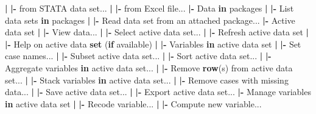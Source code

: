 \documentclass[12pt,]{krantz}
\newenvironment{Shaded}{\begin{snugshade}}{\end{snugshade}}
\newcommand{\ControlFlowTok}[1]{\textcolor[rgb]{0.13,0.29,0.53}{\textbf{#1}}}
\newcommand{\ErrorTok}[1]{\textcolor[rgb]{0.64,0.00,0.00}{\textbf{#1}}}
\newcommand{\KeywordTok}[1]{\textcolor[rgb]{0.13,0.29,0.53}{\textbf{#1}}}
\newcommand{\NormalTok}[1]{#1}
\newcommand{\OperatorTok}[1]{\textcolor[rgb]{0.81,0.36,0.00}{\textbf{#1}}}
\newcommand{\StringTok}[1]{\textcolor[rgb]{0.31,0.60,0.02}{#1}}
\begin{document}
\begin{Shaded}
\begin{Highlighting}[]
  \OperatorTok{|}\StringTok{ }\ErrorTok{|}\OperatorTok{-}\StringTok{ }\NormalTok{from STATA data set...}
  \OperatorTok{|}\StringTok{ }\ErrorTok{|}\OperatorTok{-}\StringTok{ }\NormalTok{from Excel file...}
  \OperatorTok{|-}\StringTok{ }\NormalTok{Data }\ControlFlowTok{in}\NormalTok{ packages}
  \OperatorTok{|}\StringTok{ }\ErrorTok{|}\OperatorTok{-}\StringTok{ }\NormalTok{List data sets }\ControlFlowTok{in}\NormalTok{ packages}
  \OperatorTok{|}\StringTok{ }\ErrorTok{|}\OperatorTok{-}\StringTok{ }\NormalTok{Read data set from an attached package...}
  \OperatorTok{|-}\StringTok{ }\NormalTok{Active data set}
  \OperatorTok{|}\StringTok{ }\ErrorTok{|}\OperatorTok{-}\StringTok{ }\NormalTok{View data...}
  \OperatorTok{|}\StringTok{ }\ErrorTok{|}\OperatorTok{-}\StringTok{ }\NormalTok{Select active data set...}
  \OperatorTok{|}\StringTok{ }\ErrorTok{|}\OperatorTok{-}\StringTok{ }\NormalTok{Refresh active data set}
  \OperatorTok{|}\StringTok{ }\ErrorTok{|}\OperatorTok{-}\StringTok{ }\NormalTok{Help on active data }\KeywordTok{set}\NormalTok{ (}\ControlFlowTok{if}\NormalTok{ available)}
  \OperatorTok{|}\StringTok{ }\ErrorTok{|}\OperatorTok{-}\StringTok{ }\NormalTok{Variables }\ControlFlowTok{in}\NormalTok{ active data set}
  \OperatorTok{|}\StringTok{ }\ErrorTok{|}\OperatorTok{-}\StringTok{ }\NormalTok{Set case names...}
  \OperatorTok{|}\StringTok{ }\ErrorTok{|}\OperatorTok{-}\StringTok{ }\NormalTok{Subset active data set...}
  \OperatorTok{|}\StringTok{ }\ErrorTok{|}\OperatorTok{-}\StringTok{ }\NormalTok{Sort active data set...}
  \OperatorTok{|}\StringTok{ }\ErrorTok{|}\OperatorTok{-}\StringTok{ }\NormalTok{Aggregate variables }\ControlFlowTok{in}\NormalTok{ active data set...}
  \OperatorTok{|}\StringTok{ }\ErrorTok{|}\OperatorTok{-}\StringTok{ }\NormalTok{Remove }\KeywordTok{row}\NormalTok{(s) from active data set...}
  \OperatorTok{|}\StringTok{ }\ErrorTok{|}\OperatorTok{-}\StringTok{ }\NormalTok{Stack variables }\ControlFlowTok{in}\NormalTok{ active data set...}
  \OperatorTok{|}\StringTok{ }\ErrorTok{|}\OperatorTok{-}\StringTok{ }\NormalTok{Remove cases with missing data...}
  \OperatorTok{|}\StringTok{ }\ErrorTok{|}\OperatorTok{-}\StringTok{ }\NormalTok{Save active data set...}
  \OperatorTok{|}\StringTok{ }\ErrorTok{|}\OperatorTok{-}\StringTok{ }\NormalTok{Export active data set...}
  \OperatorTok{|-}\StringTok{ }\NormalTok{Manage variables }\ControlFlowTok{in}\NormalTok{ active data set}
  \OperatorTok{|}\StringTok{ }\ErrorTok{|}\OperatorTok{-}\StringTok{ }\NormalTok{Recode variable...}
  \OperatorTok{|}\StringTok{ }\ErrorTok{|}\OperatorTok{-}\StringTok{ }\NormalTok{Compute new variable...}

\end{Highlighting}
\end{Shaded}
\end{document}
